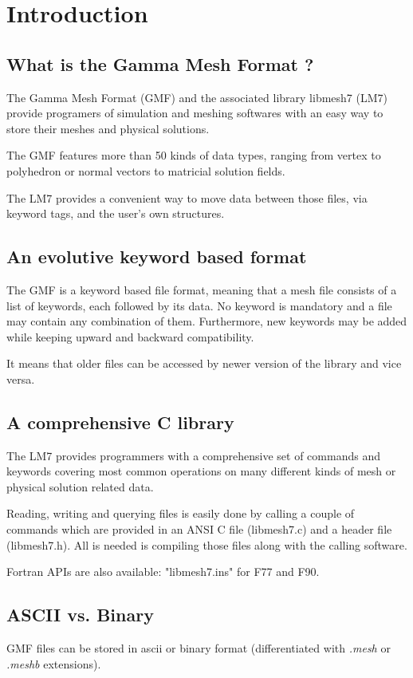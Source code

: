 \documentclass[a4paper,12pt]{article}
\begin{document}
\section{Introduction}

\subsection{What is the Gamma Mesh Format ?}
The Gamma Mesh Format (GMF) and the associated library libmesh7 (LM7) provide programers of simulation and meshing softwares with an easy way to store their meshes and physical solutions.

The GMF features more than 50 kinds of data types, ranging from vertex to polyhedron or normal vectors to matricial solution fields.

The LM7 provides a convenient way to move data between those files, via keyword tags, and the user's own structures.


\subsection{An evolutive keyword based format}
The GMF is a keyword based file format, meaning that a mesh file consists of a list of keywords, each followed by its data. No keyword is mandatory and a file may contain any combination of them. Furthermore, new keywords may be added while keeping upward and backward compatibility.

It means that older files can be accessed by newer version of the library and vice versa.


\subsection{A comprehensive C library}
The LM7 provides programmers with a comprehensive set of commands and keywords covering most common operations on many different kinds of mesh or physical solution related data.

Reading, writing and querying files is easily done by calling a couple of commands which are provided in an ANSI C file (libmesh7.c) and a header file (libmesh7.h). All is needed is compiling those files along with the calling software.

Fortran APIs are also available: "libmesh7.ins" for F77 and F90.


\subsection{ASCII vs. Binary}
GMF files can be stored in ascii or binary format (differentiated with \emph{.mesh} or \emph{.meshb} extensions).
\end{document}
